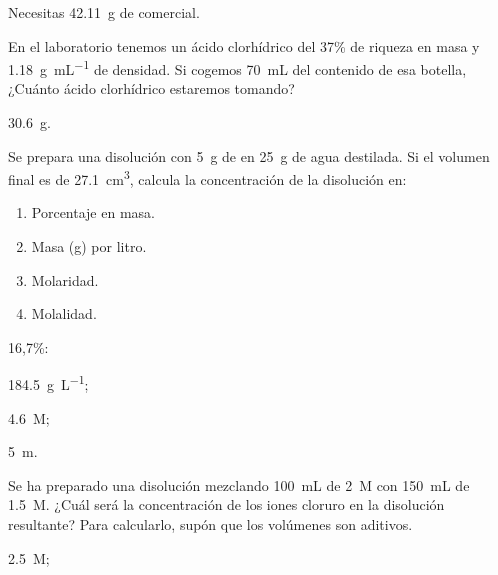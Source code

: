 \begin{solution}
  Necesitas \SI{42.11}{\gram} de  comercial.
\end{solution}




\begin{exercise}[
    tags    = {termodinámica, entalpía, entalpia de reacción, calor},
    topics  = {química, termoquímica, termodinámica},
    source  = {FQ 1B SAN 2015, p92, e33},
  ]
  En el laboratorio tenemos un ácido clorhídrico del 37\% de riqueza en masa y \SI{1.18}{\gram\per\milli\liter} de densidad. Si cogemos \SI{70}{\milli\liter} del contenido de esa botella, ¿Cuánto ácido
  clorhídrico estaremos tomando?
\end{exercise}

\begin{solution}
  \SI{30.6}{\gram}.
\end{solution}




\begin{exercise}[
    tags    = {termodinámica, entalpía, entalpia de reacción, calor},
    topics  = {química, termoquímica, termodinámica},
    source  = {FQ 1B OXF 2015, p78, e11},
  ]
  Se prepara una disolución con \SI{5}{\gram} de  en \SI{25}{\gram} de agua destilada. Si el volumen final es de \SI{27.1}{\cubic\centi\meter}, calcula la concentración de la disolución en:
  \begin{enumerate}
    \item Porcentaje en masa.
    \item Masa (\si{\gram}) por litro.
    \item Molaridad.
    \item Molalidad.
  \end{enumerate}
\end{exercise}

\begin{solution}
  \begin{enumerate*}
    \item 16,7\%:
    \item \SI{184.5}{\gram\per\liter};
    \item \SI{4.6}{M};
    \item \SI{5}{m}.
  \end{enumerate*}
\end{solution}



\begin{exercise}[
    tags    = {termodinámica, entalpía, entalpia de reacción, calor},
    topics  = {química, termoquímica, termodinámica},
    source  = {FQ 1B SAN 2015, p94, e63},
  ]
  Se ha preparado una disolución mezclando \SI{100}{\milli\liter} de  \SI{2}{M} con \SI{150}{\milli\liter} de  \SI{1.5}{M}.
  ¿Cuál será la concentración de los iones cloruro en la disolución resultante? Para calcularlo, supón que los volúmenes son aditivos.
\end{exercise}

\begin{solution}
    \SI{2.5}{M};
\end{solution}
